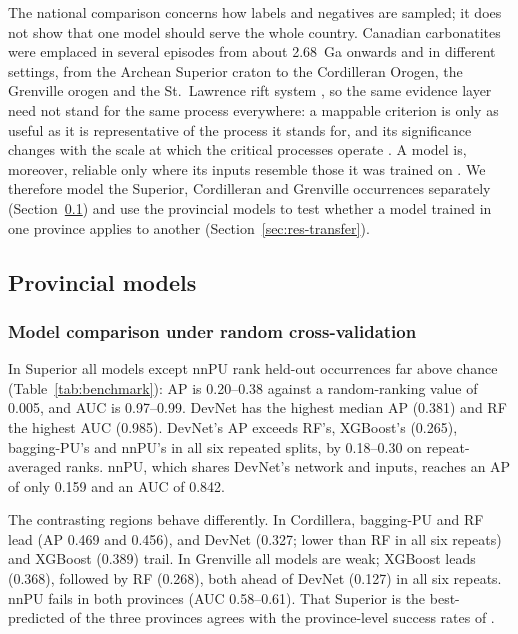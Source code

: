 \documentclass[pdflatex,sn-apa]{sn-jnl}
\begin{document}
The national comparison concerns how labels and negatives are sampled; it does not show that one model should serve the whole country. Canadian carbonatites were emplaced in several episodes from about 2.68~Ga onwards \citep{Rukhlov2010} and in different settings, from the Archean Superior craton to the Cordilleran Orogen, the Grenville orogen and the St.~Lawrence rift system \citep{Groulier2020,Neron2018}, so the same evidence layer need not stand for the same process everywhere: a mappable criterion is only as useful as it is representative of the process it stands for, and its significance changes with the scale at which the critical processes operate \citep{McCuaig2010}. A model is, moreover, reliable only where its inputs resemble those it was trained on \citep{Meyer2021}. We therefore model the Superior, Cordilleran and Grenville occurrences separately (Section~\ref{sec:res-provinces}) and use the provincial models to test whether a model trained in one province applies to another (Section~\ref{sec:res-transfer}).

\subsection{Provincial models}\label{sec:res-provinces}

\subsubsection{Model comparison under random cross-validation}\label{sec:res-random}

In Superior all models except nnPU rank held-out occurrences far above chance (Table~\ref{tab:benchmark}): AP is 0.20--0.38 against a random-ranking value of 0.005, and AUC is 0.97--0.99. DevNet has the highest median AP (0.381) and RF the highest AUC (0.985). DevNet's AP exceeds RF's, XGBoost's (0.265), bagging-PU's and nnPU's in all six repeated splits, by 0.18--0.30 on repeat-averaged ranks. nnPU, which shares DevNet's network and inputs, reaches an AP of only 0.159 and an AUC of 0.842.

The contrasting regions behave differently. In Cordillera, bagging-PU and RF lead (AP 0.469 and 0.456), and DevNet (0.327; lower than RF in all six repeats) and XGBoost (0.389) trail. In Grenville all models are weak; XGBoost leads (0.368), followed by RF (0.268), both ahead of DevNet (0.127) in all six repeats. nnPU fails in both provinces (AUC 0.58--0.61). That Superior is the best-predicted of the three provinces agrees with the province-level success rates of \citet{Parsa2024}.
\end{document}
